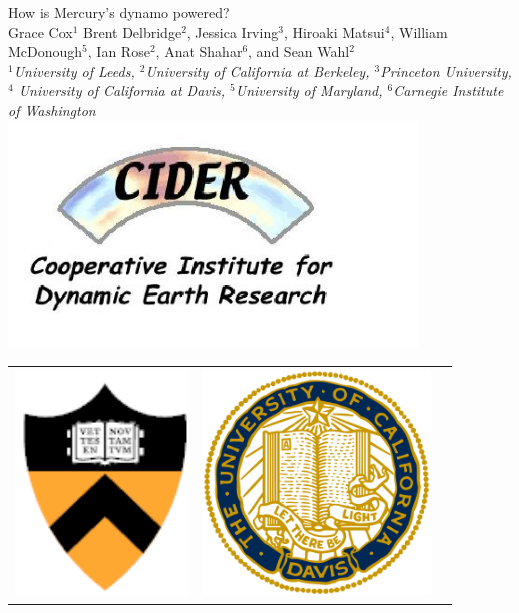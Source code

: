 \documentclass[landscape,a0b,final]{a0poster}
\begin{document}
\begin{center}
\begin{minipage}[c][9cm][c]{0.78\textwidth}
  \begin{center}
    {\sc \Huge How is Mercury's dynamo powered?}\\[10mm]
    {\Large Grace Cox$^1$ Brent Delbridge$^2$, Jessica Irving$^3$, Hiroaki Matsui$^4$, William McDonough$^5$, Ian Rose$^2$, Anat Shahar$^6$, and Sean Wahl$^2$}\\[7.5mm]
    \emph{ $^1$University of Leeds, $^2$University of California at Berkeley, $^3$Princeton University, $^4$ University of California at Davis, $^5$University of Maryland, $^6$Carnegie Institute of Washington}\\[7.5mm]
    \includegraphics[height=6cm,angle=0]{logo_cider.jpg} 
  \end{center}
\end{minipage}
\hspace*{-9cm}
\begin{minipage}[c][9cm][c]{0.1\textwidth}
  \begin{center}
    \begin{tabular}{ccc}
    \includegraphics[height=6cm,angle=0]{princeton.png} &
    \includegraphics[height=6cm,angle=0]{davis.png} &

\end{tabular}
\end{center}
\end{minipage}
\end{center}
\end{document}
